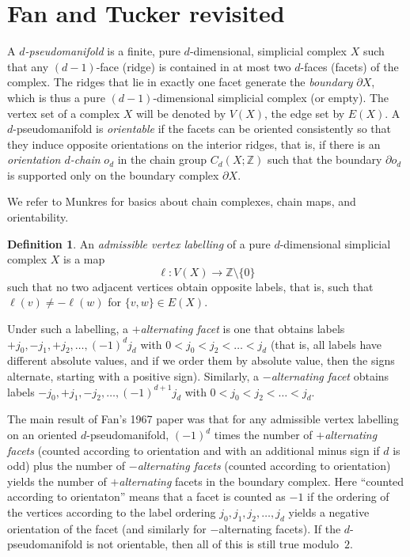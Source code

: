 \documentclass[11pt,a4paper,draft]{article}
\newcommand{\Z}{{\mathbb Z}}
\newcommand\sm{{\setminus}}
\theoremstyle{definition}
\newtheorem{definition}[theorem]{Definition}
\begin{document}
\section{Fan and Tucker revisited}\label{sec:basics}

A \emph{$d$-pseudomanifold} is a finite, pure $d$-dimensional, simplicial
complex $X$ such that any $(d-1)$-face (ridge) is contained in at
most two $d$-faces (facets) of the complex.  The ridges that lie in
exactly one facet generate the \emph{boundary} $\partial X$, which is thus
a pure $(d-1)$-dimensional simplicial complex (or empty).  The vertex set of a
complex $X$ will be denoted by $V(X)$, the edge set by $E(X)$.
A $d$-pseudomanifold is \emph{orientable} if the facets can be oriented
consistently so that they induce opposite orientations on the interior ridges,
that is, if there is an \emph{orientation $d$-chain} $o_d$ in the chain group
$C_d(X;\Z)$ such that the boundary $\partial o_d$ is supported only on
the boundary complex $\partial X$.

We refer to Munkres \cite{Munkres:AT}
for basics about chain complexes, chain maps, and orientability.

\begin{definition}\label{def:admissible}
    An \emph{admissible vertex labelling} of a pure $d$-dimensional simplicial
    complex $X$ is a map
\[
    \ell:V(X)\longrightarrow\Z\sm\{0\}
\]
    such that no two adjacent vertices obtain opposite labels, that is, such that
    $\ell(v)\neq-\ell(w)$ for $\{v,w\}\in E(X)$.

    Under such a labelling, a \emph{$+$alternating facet} is one that
    obtains labels $+j_0,-j_1,+j_2,\dots,(-1)^dj_d$ with
    $0<j_0<j_2<\dots<j_d$ (that is, all labels have different absolute
    values, and if we order them by absolute value, then the signs alternate, starting
    with a positive sign).  Similarly, a \emph{$-$alternating facet} 
    obtains labels $-j_0,+j_1,-j_2,\dots,(-1)^{d+1} j_d$ with
    $0<j_0<j_2<\dots<j_d$.
\end{definition}


The main result of Fan's 1967 paper \cite{fan67} was that for any admissible
vertex labelling on an oriented
$d$-pseudomanifold, $(-1)^d$ times the number of \emph{$+$alternating facets}
(counted according to orientation and with an additional
minus sign if $d$ is odd) plus the number of
\emph{$-$alternating facets} (counted according to orientation) yields the number of
\emph{$+$alternating} facets in the boundary complex.  Here
``counted according to orientaton'' means that a facet is counted as $-1$ if
the ordering of the vertices according to the label ordering
$j_0,j_1,j_2,\dots,j_d$ yields a negative orientation of the facet (and
similarly for $-$alternating facets).
If the $d$-pseudomanifold is not orientable, then all of this is still true
modulo~$2$.
\end{document}
